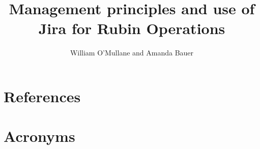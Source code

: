 \documentclass[DM,authoryear,toc]{lsstdoc}
\title{Management principles and use of Jira for Rubin Operations}
\author{%
William O'Mullane and  Amanda Bauer
}
\date{\vcsDate}
\begin{document}
\maketitle



\appendix
\section{References} \label{sec:bib}
\renewcommand{\refname}{} %


\section{Acronyms} \label{sec:acronyms}
%
\printglossaries
\end{document}
